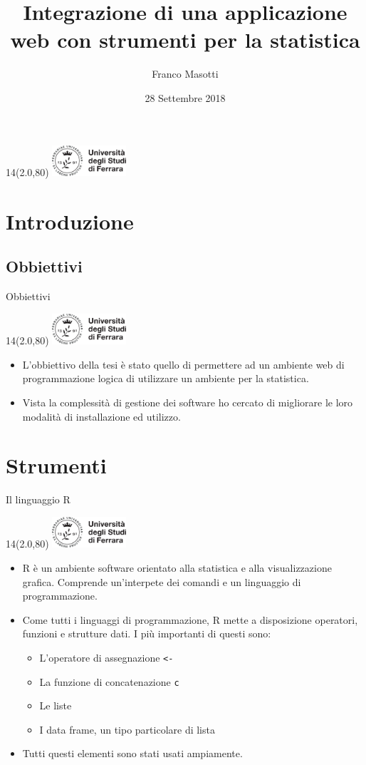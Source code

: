 \documentclass[11pt,xcolor={dvipsnames},default]{beamer} %
\title[Integrazione applicazione web]{Integrazione di una applicazione web con strumenti per la statistica}
\author[Franco Masotti]
{Franco Masotti}
\institute[UNIFE]
{
  Università degli studi di Ferrara \\
  Dipartimento di Matematica e Informatica \\[0.5Cm]
  Relatore\\ Prof. \textbf{Fabrizio Riguzzi}\\[0.25Cm]
  }
\date{28 Settembre 2018}
\newcommand{\MyLogo}{%
\begin{textblock}{14}(2.0,80)
 \includegraphics[height=1.15cm, angle=0]{logo}
\end{textblock}
}
\begin{document}

\begin{frame}
\transdissolve
\MyLogo
\begin{center}
  \titlepage
\end{center}
\end{frame}



\section{Introduzione}
\subsection{Obbiettivi}
\begin{frame}{Obbiettivi}
\transboxin
\MyLogo
\begin{itemize}
\item L'obbiettivo della tesi è stato quello di permettere ad un ambiente web
di programmazione logica di utilizzare un ambiente per la statistica.
\item Vista la complessità di gestione dei software ho cercato di 
migliorare le loro modalità di installazione ed utilizzo.
\end{itemize}
\end{frame}

\section{Strumenti}
\begin{frame}{Il linguaggio R}
\transboxin
\MyLogo
\begin{itemize}
\item R è un ambiente software orientato alla statistica e alla visualizzazione 
grafica. Comprende un'interpete dei comandi e un linguaggio di programmazione.
\item Come tutti i linguaggi di programmazione, R mette a disposizione 
operatori, funzioni e strutture dati. I più importanti di questi sono:
\begin{itemize}
\item L'operatore di assegnazione \texttt{<-}
\item La funzione di concatenazione \texttt{c}
\item Le liste
\item I data frame, un tipo particolare di lista
\end{itemize}
\item Tutti questi elementi sono stati usati ampiamente.
\end{itemize}
\end{frame}
\end{document}
